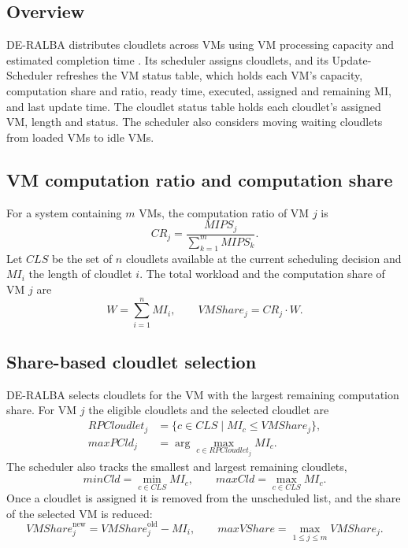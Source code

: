 \documentclass[default,sn-mathphys,Numbered]{sn-jnl}
\begin{document}
\subsection{Overview}
DE-RALBA distributes cloudlets across VMs using VM processing capacity and estimated completion time \cite{hussain2025deralba}. Its scheduler assigns cloudlets, and its Update-Scheduler refreshes the VM status table, which holds each VM's capacity, computation share and ratio, ready time, executed, assigned and remaining MI, and last update time. The cloudlet status table holds each cloudlet's assigned VM, length and status. The scheduler also considers moving waiting cloudlets from loaded VMs to idle VMs.

\subsection{VM computation ratio and computation share}
For a system containing $m$ VMs, the computation ratio of VM $j$ is
\begin{equation}\label{eq:cr}
\mathit{CR}_j = \frac{\mathit{MIPS}_j}{\sum_{k=1}^{m} \mathit{MIPS}_k}.
\end{equation}
Let $\mathit{CLS}$ be the set of $n$ cloudlets available at the current scheduling decision and $\mathit{MI}_i$ the length of cloudlet $i$. The total workload and the computation share of VM $j$ are
\begin{equation}\label{eq:share}
W = \sum_{i=1}^{n} \mathit{MI}_i, \qquad \mathit{VMShare}_j = \mathit{CR}_j \cdot W .
\end{equation}

\subsection{Share-based cloudlet selection}
DE-RALBA selects cloudlets for the VM with the largest remaining computation share. For VM $j$ the eligible cloudlets and the selected cloudlet are
\begin{align}
\mathit{RPCloudlet}_j &= \{ c \in \mathit{CLS} \mid \mathit{MI}_c \le \mathit{VMShare}_j \}, \label{eq:rp}\\
\mathit{maxPCld}_j &= \arg\max_{c \in \mathit{RPCloudlet}_j} \mathit{MI}_c . \label{eq:maxp}
\end{align}
The scheduler also tracks the smallest and largest remaining cloudlets,
\begin{equation}\label{eq:minmax}
\mathit{minCld} = \min_{c \in \mathit{CLS}} \mathit{MI}_c, \qquad \mathit{maxCld} = \max_{c \in \mathit{CLS}} \mathit{MI}_c .
\end{equation}
Once a cloudlet is assigned it is removed from the unscheduled list, and the share of the selected VM is reduced:
\begin{equation}\label{eq:shareupd}
\mathit{VMShare}_j^{\text{new}} = \mathit{VMShare}_j^{\text{old}} - \mathit{MI}_i, \qquad
\mathit{maxVShare} = \max_{1 \le j \le m} \mathit{VMShare}_j .
\end{equation}
\end{document}
